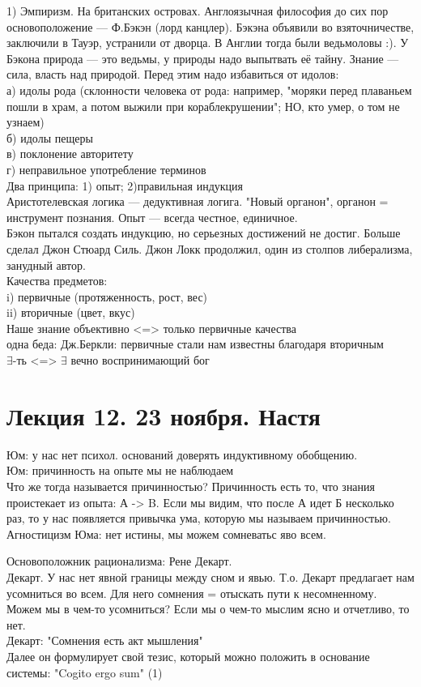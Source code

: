 \documentclass[a4paper,12pt]{article}
\begin{document}
1) Эмпиризм. На британских островах. Англоязычная философия до сих пор основоположение --- Ф.Бэкэн (лорд канцлер). Бэкэна объявили во взяточничестве, заключили в Тауэр, устранили от дворца. В Англии тогда были ведьмоловы :). У Бэкона природа --- это ведьмы, у природы надо выпытвать её тайну. Знание --- сила, власть над природой. Перед этим надо избавиться от идолов:\\
а) идолы рода (склонности человека от рода: например, "моряки перед плаваньем пошли в храм, а потом выжили при кораблекрушении"; НО, кто умер, о том не узнаем)\\
б) идолы пещеры \\
в) поклонение авторитету \\
г) неправильное употребление терминов\\
Два принципа: 1) опыт; 2)правильная индукция\\
Аристотелевская логика --- дедуктивная логига. "Новый органон", органон = инструмент познания. Опыт --- всегда честное, единичное.\\
Бэкон пытался создать индукцию, но серьезных достижений не достиг. Больше сделал Джон Стюард Силь. Джон Локк продолжил, один из столпов либерализма, занудный автор.\\
Качества предметов:\\
i) первичные (протяженность, рост, вес)\\
ii) вторичные (цвет, вкус) \\
Наше знание объективно <=> только первичные качества \\
одна беда: Дж.Беркли: первичные стали нам известны благодаря вторичным \\
$\exists$-ть <=> $\exists$ вечно воспринимающий бог 
\section{Лекция 12. 23 ноября. Настя} 
Юм: у нас нет психол. оснований доверять индуктивному обобщению.\\
Юм: причинность на опыте мы не наблюдаем \\
Что же тогда называется причинностью? Причинность есть то, что знания проистекает из опыта: А -> B. Если мы видим, что после А идет Б несколько раз, то у нас появляется привычка ума, которую мы называем причинностью.\\
Агностицизм Юма: нет истины, мы можем сомневатьс яво всем.

Основоположник рационализма: Рене Декарт.\\
Декарт. У нас нет явной границы между сном и явью. Т.о. Декарт предлагает нам усомниться во всем. Для него сомнения = отыскать пути к несомненному. Можем мы в чем-то усомниться? Если мы о чем-то мыслим ясно и отчетливо, то нет.\\
Декарт: "Сомнения есть акт мышления"\\
Далее он формулирует свой тезис, который можно положить в основание системы: "Cogito ergo sum" (1)\\
\end{document}
